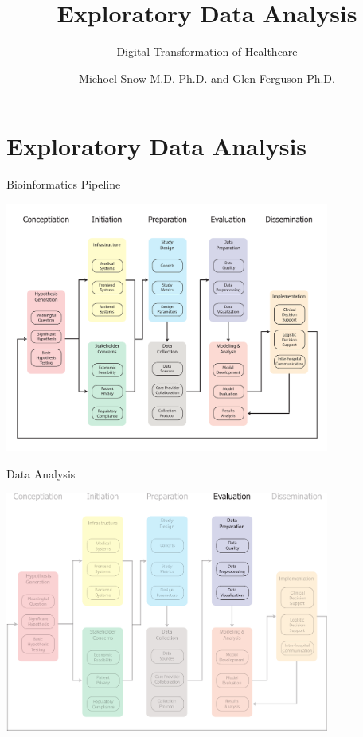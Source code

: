 \documentclass[10pt]{beamer}
\title{Exploratory Data Analysis}
\subtitle{Digital Transformation of Healthcare}
\date{}
\author{Michoel Snow M.D. Ph.D. and Glen Ferguson Ph.D.}
\institute{Center for Health Data Innovations}
\begin{document}
\maketitle

\section{Exploratory Data Analysis}

\begin{frame}{Bioinformatics Pipeline}
	\begin{center}
		\includegraphics[width=0.8\textwidth]{images/informatics_pipeline.pdf}	
	\end{center}
\end{frame}


\begin{frame}{Data Analysis}
	\begin{center}
		\includegraphics[width=0.8\textwidth]{images/informatics_pipeline_evaluation.pdf}
	\end{center}
\end{frame}
\end{document}
